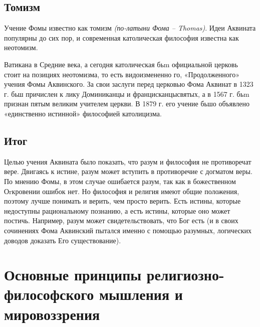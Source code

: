 \documentclass[
]{article}
\begin{document}
\hypertarget{ux442ux43eux43cux438ux437ux43c}{%
\subsection{Томизм}\label{ux442ux43eux43cux438ux437ux43c}}

Учение Фомы известно как томизм \emph{(по-латыни Фома -- Thomas)}. Идеи
Аквината популярны до сих пор, и современная католическая философия
известна как неотомизм.

Ватикана в Средние века, а сегодня католическая бьm официальной церковь
стоит на позициях неотомизма, то есть видоизмененно­ го, «Продолженного»
учения Фомы Аквинского. За свои заслуги перед церковью Фома Аквинат в
1323 г. бьш причислен к лику Доминиканцы и францисканцысвятых, а в 1567
г. бьm признан пятым великим учителем церк­ви. В 1879 г. его учение бьшо
объявлено «единственно истин­ной» философией католицизма.

\hypertarget{ux438ux442ux43eux433-4}{%
\subsection{Итог}\label{ux438ux442ux43eux433-4}}

Целью учения Аквината было показать, что разум и философия не
противоречат вере. Двигаясь к истине, разум может вступить в
противоречие с догматом веры. По мнению Фомы, в этом случае ошибается
разум, так как в божественном Оrкровении ошибок нет. Но философия и
религия имеют общие положения, поэтому лучше понимать и верить, чем
просто верить. Есть истины, которые недоступны рациональному познанию, а
есть истины, которые оно может постичь. Например, разум может
свидетельствовать, что Бог есть (и в своих сочинениях Фома Аквинский
пытался именно с помощью разумных, логических доводов доказать Его
существование).

\hypertarget{ux43eux441ux43dux43eux432ux43dux44bux435-ux43fux440ux438ux43dux446ux438ux43fux44b-ux440ux435ux43bux438ux433ux438ux43eux437ux43dux43e-ux444ux438ux43bux43eux441ux43eux444ux441ux43aux43eux433ux43e-ux43cux44bux448ux43bux435ux43dux438ux44f-ux438-ux43cux438ux440ux43eux432ux43eux437ux437ux440ux435ux43dux438ux44f}{%
\section{Основные принципы религиозно-философского мышления и
мировоззрения}\label{ux43eux441ux43dux43eux432ux43dux44bux435-ux43fux440ux438ux43dux446ux438ux43fux44b-ux440ux435ux43bux438ux433ux438ux43eux437ux43dux43e-ux444ux438ux43bux43eux441ux43eux444ux441ux43aux43eux433ux43e-ux43cux44bux448ux43bux435ux43dux438ux44f-ux438-ux43cux438ux440ux43eux432ux43eux437ux437ux440ux435ux43dux438ux44f}}
\end{document}
